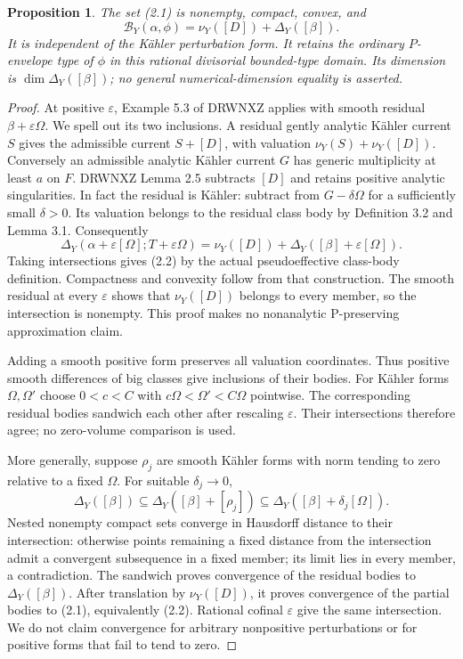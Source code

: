 \documentclass[11pt]{article}
\newtheorem{proposition}{Proposition}
\newcommand{\B}{\mathcal B}
\begin{document}
\begin{proposition}
The set (2.1) is nonempty, compact, convex, and
\[
 \B_Y(\alpha,\phi)=\nu_Y([D])+\Delta_Y([\beta]). \tag{2.2}
\]
It is independent of the K\"ahler perturbation form. It retains the ordinary $P$-envelope type of $\phi$ in this rational divisorial bounded-type domain. Its dimension is $\dim\Delta_Y([\beta])$; no general numerical-dimension equality is asserted.
\end{proposition}
\begin{proof}
At positive $\varepsilon$, Example 5.3 of DRWNXZ applies with smooth residual $\beta+\varepsilon\Omega$. We spell out its two inclusions. A residual gently analytic K\"ahler current $S$ gives the admissible current $S+[D]$, with valuation $\nu_Y(S)+\nu_Y([D])$. Conversely an admissible analytic K\"ahler current $G$ has generic multiplicity at least $a$ on $F$. DRWNXZ Lemma 2.5 subtracts $[D]$ and retains positive analytic singularities. In fact the residual is K\"ahler: subtract from $G-\delta\Omega$ for a sufficiently small $\delta>0$. Its valuation belongs to the residual class body by Definition 3.2 and Lemma 3.1. Consequently
\[
 \Delta_Y(\alpha+\varepsilon[\Omega];T+\varepsilon\Omega)
 =\nu_Y([D])+\Delta_Y([\beta]+\varepsilon[\Omega]). \tag{2.3}
\]
Taking intersections gives (2.2) by the actual pseudoeffective class-body definition. Compactness and convexity follow from that construction. The smooth residual at every $\varepsilon$ shows that $\nu_Y([D])$ belongs to every member, so the intersection is nonempty. This proof makes no nonanalytic P-preserving approximation claim.

Adding a smooth positive form preserves all valuation coordinates. Thus positive smooth differences of big classes give inclusions of their bodies. For K\"ahler forms $\Omega,\Omega'$ choose $0<c<C$ with $c\Omega<\Omega'<C\Omega$ pointwise. The corresponding residual bodies sandwich each other after rescaling $\varepsilon$. Their intersections therefore agree; no zero-volume comparison is used.

More generally, suppose $\rho_j$ are smooth K\"ahler forms with norm tending to zero relative to a fixed $\Omega$. For suitable $\delta_j\to0$,
\[
 \Delta_Y([\beta])\subseteq\Delta_Y([\beta]+[\rho_j])
 \subseteq\Delta_Y([\beta]+\delta_j[\Omega]).
\]
Nested nonempty compact sets converge in Hausdorff distance to their intersection: otherwise points remaining a fixed distance from the intersection admit a convergent subsequence in a fixed member; its limit lies in every member, a contradiction. The sandwich proves convergence of the residual bodies to $\Delta_Y([\beta])$. After translation by $\nu_Y([D])$, it proves convergence of the partial bodies to (2.1), equivalently (2.2). Rational cofinal $\varepsilon$ give the same intersection. We do not claim convergence for arbitrary nonpositive perturbations or for positive forms that fail to tend to zero.
\end{proof}
\end{document}
